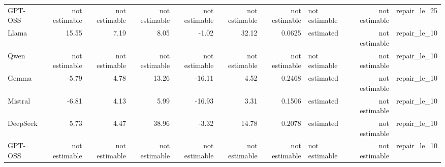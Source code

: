 \begin{tabular}{lrrrrrrlrl}
GPT-OSS & not estimable & not estimable & not estimable & not estimable & not estimable & not estimable & not estimable & not estimable & repair\_le\_25 \\
Llama & 15.55 & 7.19 & 8.05 & -1.02 & 32.12 & 0.0625 & estimated & not estimable & repair\_le\_10 \\
Qwen & not estimable & not estimable & not estimable & not estimable & not estimable & not estimable & not estimable & not estimable & repair\_le\_10 \\
Gemma & -5.79 & 4.78 & 13.26 & -16.11 & 4.52 & 0.2468 & estimated & not estimable & repair\_le\_10 \\
Mistral & -6.81 & 4.13 & 5.99 & -16.93 & 3.31 & 0.1506 & estimated & not estimable & repair\_le\_10 \\
DeepSeek & 5.73 & 4.47 & 38.96 & -3.32 & 14.78 & 0.2078 & estimated & not estimable & repair\_le\_10 \\
GPT-OSS & not estimable & not estimable & not estimable & not estimable & not estimable & not estimable & not estimable & not estimable & repair\_le\_10 \\
\bottomrule
\end{tabular}
